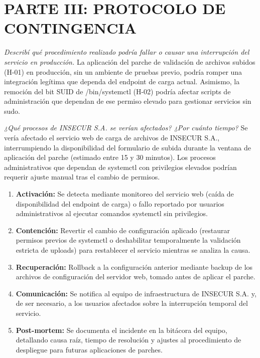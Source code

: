 \documentclass[11pt,a4paper]{article}
\begin{document}
\section{PARTE III: PROTOCOLO DE CONTINGENCIA}

\begin{campo}
\textit{Describí qué procedimiento realizado podría fallar o causar una interrupción del servicio en producción.}
La aplicación del parche de validación de archivos subidos (H-01) en producción, sin un ambiente de pruebas previo, podría romper una integración legítima que dependa del endpoint de carga actual. Asimismo, la remoción del bit SUID de /bin/systemctl (H-02) podría afectar scripts de administración que dependan de ese permiso elevado para gestionar servicios sin sudo.\\\vspace{0.5cm}
\end{campo}

\begin{campo}
\textit{¿Qué procesos de INSECUR S.A. se verían afectados? ¿Por cuánto tiempo?}
Se vería afectado el servicio web de carga de archivos de INSECUR S.A., interrumpiendo la disponibilidad del formulario de subida durante la ventana de aplicación del parche (estimado entre 15 y 30 minutos). Los procesos administrativos que dependan de systemctl con privilegios elevados podrían requerir ajuste manual tras el cambio de permisos.\\\vspace{0.5cm}
\end{campo}

\begin{campo}
\begin{enumerate}
  \item \textbf{Activación:} Se detecta mediante monitoreo del servicio web (caída de disponibilidad del endpoint de carga) o fallo reportado por usuarios administrativos al ejecutar comandos systemctl sin privilegios.
  \item \textbf{Contención:} Revertir el cambio de configuración aplicado (restaurar permisos previos de systemctl o deshabilitar temporalmente la validación estricta de uploads) para restablecer el servicio mientras se analiza la causa.
  \item \textbf{Recuperación:} Rollback a la configuración anterior mediante backup de los archivos de configuración del servidor web, tomado antes de aplicar el parche.
  \item \textbf{Comunicación:} Se notifica al equipo de infraestructura de INSECUR S.A. y, de ser necesario, a los usuarios afectados sobre la interrupción temporal del servicio.
  \item \textbf{Post-mortem:} Se documenta el incidente en la bitácora del equipo, detallando causa raíz, tiempo de resolución y ajustes al procedimiento de despliegue para futuras aplicaciones de parches.
\end{enumerate}
\vspace{2cm}
\end{campo}
\end{document}
